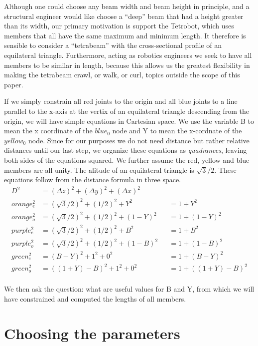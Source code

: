 \documentclass[11pt]{article}
\begin{document}
 Although one could choose any beam width and beam height in principle, and a structural engineer would like choose a ``deep'' beam that had
 a height greater than its width, our primary motivation is support the Tetrobot, which uses members that all have the same maximum and
 minimum length. It therefore is sensible to consider a ``tetrabeam'' with the cross-sectional profile of an equilateral triangle.
 Furthermore, acting as robotics engineers we seek to have all members to be similar in length, because this allows us the greatest
 flexibility in making the tetrabeam crawl, or walk, or curl, topics outside the scope of this paper.

 If we simply constrain all red joints to the origin and all blue joints to a line parallel to the x-axis at the vertix of an equilateral
 triangle descending from the origin, we will have simple equations in Cartesian space. We use the variable B to mean the x coordinate
 of the $blue_0$ node and Y to mean the x-cordnate of the $yellow_0$ node. Since for our purposes we do not need distance but rather relative distances
 until our last step, we organize these equations as \emph{quadrances}, leaving both sides of the equations squared.
 We further assume the red, yellow and blue members are all unity. The alitude of an equilateral triangle is $\sqrt{3}/2$.
 These equations follow from the distance formula in three space.
 \begin{align*}
   D^2 &= (\Delta z)^2 + (\Delta y)^2 + (\Delta x)^2 \\
 orange_e^2 &= (\sqrt{3}/2)^2 + (1/2)^2 + Y^2 & &= 1 + Y^2\\
 orange_o^2 &= (\sqrt{3}/2)^2 + (1/2)^2 + (1-Y)^2 & &= 1 + (1-Y)^2\\
 purple_e^2 &= (\sqrt{3}/2)^2 + (1/2)^2 + B^2 & &= 1 + B^2\\
 purple_o^2 &= (\sqrt{3}/2)^2 + (1/2)^2 + (1-B)^2 & &=  1+ (1-B)^2\\
 green_e^2 &= (B - Y)^2 + 1^2 + 0^2 & &= 1 + (B - Y)^2 \\ 
 green_o^2 &= ((1+Y) - B)^2 + 1^2 + 0^2 & &= 1 + ((1+Y) - B)^2 \\ 
\end{align*}

 We then ask the question: what are useful values for B and Y, from which we will have constrained and computed the lengths of all
 members.

 \section{Choosing the parameters}
\end{document}
